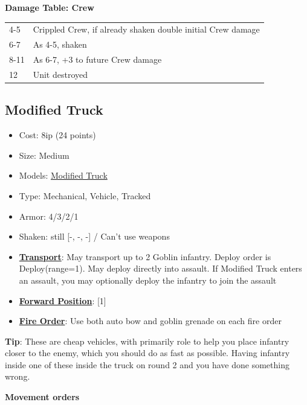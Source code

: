 \documentclass[a4paper,12pt]{article}
\begin{document}
\noindent\textbf{Damage Table: Crew}

\begin{tabular}{@{}lp{}@{}}
4-5 & Crippled Crew, if already shaken double initial Crew damage \\
6-7 & As 4-5, shaken \\
8-11 & As 6-7, +3 to future Crew damage \\
12 & Unit destroyed \\
\end{tabular}
\vspace{1ex}
\subsection{Modified Truck}
\label{unit-modified-truck}

\begin{itemize}
\item Cost: 8ip (24 points)
\item Size: Medium
\item Models: \hyperref[model-modified-truck]{Modified Truck}
\item Type: Mechanical, Vehicle, Tracked
\item Armor: 4/3/2/1
\item Shaken: still [-, -, -] / Can't use weapons
\item \textbf{\hyperref[rule-special-transport]{Transport}}: May transport up to 2 Goblin infantry. Deploy order is Deploy(range=1). May deploy directly into assault. If Modified Truck enters an assault, you may optionally deploy the infantry to join the assault
\item \textbf{\hyperref[rule-special-forward-position]{Forward Position}}: [1]
\item \textbf{\hyperref[rule-special-fire-order]{Fire Order}}: Use both auto bow and goblin grenade on each fire order

\end{itemize}
\noindent\textbf{Tip}: These are cheap vehicles, with primarily role to help you place infantry closer to the enemy, which you should do as fast as possible. Having infantry inside one of these inside the truck on round 2 and you have done something wrong.

\noindent\textbf{Movement orders}
\end{document}
